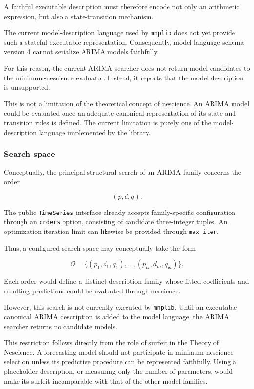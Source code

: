 A faithful executable description must therefore encode not only an arithmetic
expression, but also a state-transition mechanism.

The current model-description language used by \texttt{mnplib} does not yet
provide such a stateful executable representation. Consequently, model-language
schema version 4 cannot serialize ARIMA models faithfully.

For this reason, the current ARIMA searcher does not return model candidates to
the minimum-nescience evaluator. Instead, it reports that the model description
is unsupported.

This is not a limitation of the theoretical concept of nescience. An ARIMA
model could be evaluated once an adequate canonical representation of its state
and transition rules is defined. The current limitation is purely one of the
model-description language implemented by the library.

\subsubsection{Search space}

Conceptually, the principal structural search of an ARIMA family concerns the
order

\[
(p,d,q).
\]

The public \texttt{TimeSeries} interface already accepts family-specific
configuration through an \texttt{orders} option, consisting of candidate
three-integer tuples. An optimization iteration limit can likewise be provided
through \texttt{max\_iter}.

Thus, a configured search space may conceptually take the form

\[
\mathcal O
=
\{
(p_1,d_1,q_1),
\ldots,
(p_m,d_m,q_m)
\}.
\]

Each order would define a distinct description family whose fitted coefficients
and resulting predictions could be evaluated through nescience.

However, this search is not currently executed by \texttt{mnplib}. Until an
executable canonical ARIMA description is added to the model language, the
ARIMA searcher returns no candidate models.

This restriction follows directly from the role of surfeit in the Theory of
Nescience. A forecasting model should not participate in minimum-nescience
selection unless its predictive procedure can be represented faithfully. Using a
placeholder description, or measuring only the number of parameters, would make
its surfeit incomparable with that of the other model families.

